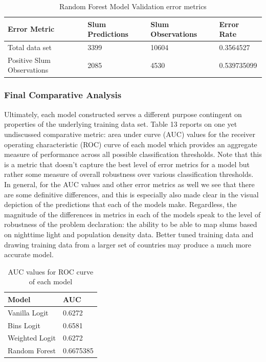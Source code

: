 \begin{table}[ht]
\centering
\caption{Random Forest Model Validation error metrics}
\begin{tabular}{llll}
  \hline \hline
  Error Metric &  Slum Predictions &  Slum Observations  & Error Rate \\ 
  \hline
Total data set & 3399 & 10604 & 0.3564527 \\ 
Positive Slum Observations & 2085 & 4530 & 0.539735099\\
   \hline
\end{tabular}
\end{table}




\subsubsection{Final Comparative Analysis}

Ultimately, each model constructed serves a different purpose contingent on properties of the underlying training data set. Table 13 reports on one yet undiscussed comparative metric: area under curve (AUC) values for the receiver operating characteristic (ROC) curve of each model which provides an aggregate measure of performance across all possible classification thresholds. Note that this is a metric that doesn't capture the best level of error metrics for a model but rather some measure of overall robustness over various classification thresholds. In general, for the AUC values and other error metrics as well we see that there are some definitive differences, and this is especially also made clear in the visual depiction of the predictions that each of the models make. Regardless, the magnitude of the differences in metrics in each of the models speak to the level of robustness of the problem declaration: the ability to be able to map slums based on nighttime light and population density data. Better tuned training data and drawing training data from a larger set of countries may produce a much more accurate model.

\begin{table}[ht]
\centering
\caption{AUC values for ROC curve of each model}
\begin{tabular}{ll}
  \hline \hline
  Model &  AUC\\ 
  \hline
Vanilla Logit & 0.6272 \\ 
Bins Logit & 0.6581\\
Weighted Logit & 0.6272\\
Random Forest & 0.6675385\\
   \hline
\end{tabular}
\end{table}